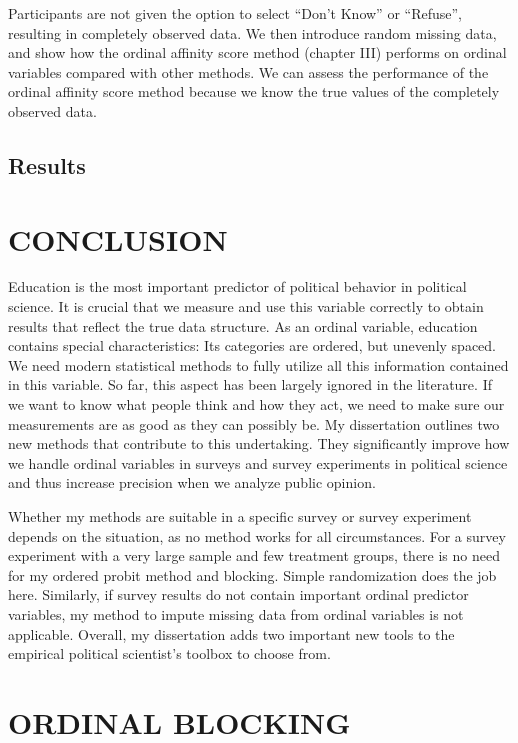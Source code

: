 \documentclass[12pt,econ]{sources/authesis}
\begin{document}
Participants are not given the option to select ``Don't Know'' or ``Refuse'', resulting in completely observed data. We then introduce random missing data, and show how the ordinal affinity score method (chapter III) performs on ordinal variables compared with other methods. We can assess the performance of the ordinal affinity score method because we know the true values of the completely observed data.

\hypertarget{framing-results}{%
\section{Results}\label{framing-results}}

\hypertarget{conclusion}{%
\chapter{CONCLUSION}\label{conclusion}}

Education is the most important predictor of political behavior in political science. It is crucial that we measure and use this variable correctly to obtain results that reflect the true data structure. As an ordinal variable, education contains special characteristics: Its categories are ordered, but unevenly spaced. We need modern statistical methods to fully utilize all this information contained in this variable. So far, this aspect has been largely ignored in the literature. If we want to know what people think and how they act, we need to make sure our measurements are as good as they can possibly be. My dissertation outlines two new methods that contribute to this undertaking. They significantly improve how we handle ordinal variables in surveys and survey experiments in political science and thus increase precision when we analyze public opinion.

Whether my methods are suitable in a specific survey or survey experiment depends on the situation, as no method works for all circumstances. For a survey experiment with a very large sample and few treatment groups, there is no need for my ordered probit method and blocking. Simple randomization does the job here. Similarly, if survey results do not contain important ordinal predictor variables, my method to impute missing data from ordinal variables is not applicable. Overall, my dissertation adds two important new tools to the empirical political scientist's toolbox to choose from.

\appendix

\hypertarget{app-ordblock}{%
\chapter{ORDINAL BLOCKING}\label{app-ordblock}}
\end{document}
